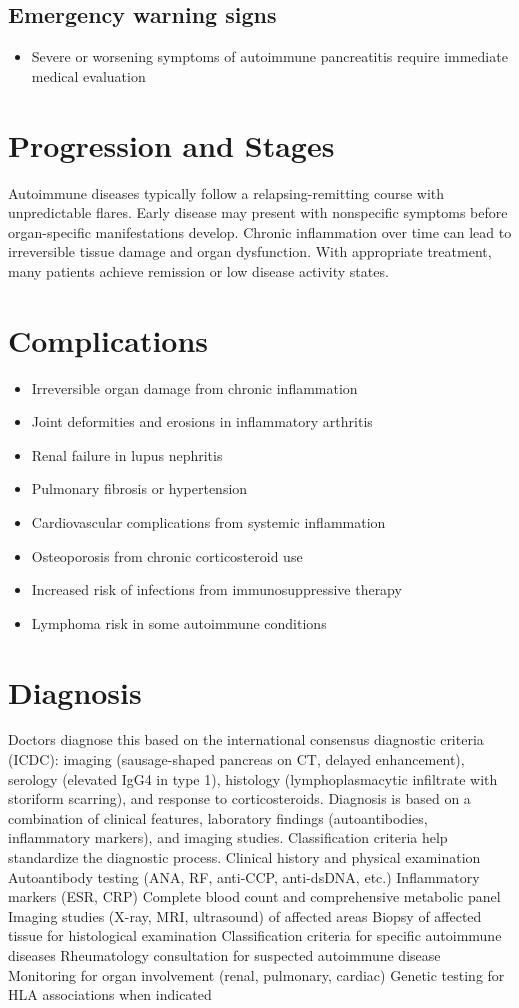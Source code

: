 \subsection{Emergency warning signs}
\begin{itemize}[noitemsep]
  \item Severe or worsening symptoms of autoimmune pancreatitis require immediate medical evaluation
\end{itemize}
\section{Progression and Stages}
Autoimmune diseases typically follow a relapsing-remitting course with unpredictable flares. Early disease may present with nonspecific symptoms before organ-specific manifestations develop. Chronic inflammation over time can lead to irreversible tissue damage and organ dysfunction. With appropriate treatment, many patients achieve remission or low disease activity states.
\section{Complications}
\begin{itemize}[noitemsep]
  \item Irreversible organ damage from chronic inflammation
  \item Joint deformities and erosions in inflammatory arthritis
  \item Renal failure in lupus nephritis
  \item Pulmonary fibrosis or hypertension
  \item Cardiovascular complications from systemic inflammation
  \item Osteoporosis from chronic corticosteroid use
  \item Increased risk of infections from immunosuppressive therapy
  \item Lymphoma risk in some autoimmune conditions
\end{itemize}
\section{Diagnosis}
Doctors diagnose this based on the international consensus diagnostic criteria (ICDC): imaging (sausage-shaped pancreas on CT, delayed enhancement), serology (elevated IgG4 in type 1), histology (lymphoplasmacytic infiltrate with storiform scarring), and response to corticosteroids. Diagnosis is based on a combination of clinical features, laboratory findings (autoantibodies, inflammatory markers), and imaging studies. Classification criteria help standardize the diagnostic process. Clinical history and physical examination Autoantibody testing (ANA, RF, anti-CCP, anti-dsDNA, etc.) Inflammatory markers (ESR, CRP) Complete blood count and comprehensive metabolic panel Imaging studies (X-ray, MRI, ultrasound) of affected areas Biopsy of affected tissue for histological examination Classification criteria for specific autoimmune diseases Rheumatology consultation for suspected autoimmune disease Monitoring for organ involvement (renal, pulmonary, cardiac) Genetic testing for HLA associations when indicated


